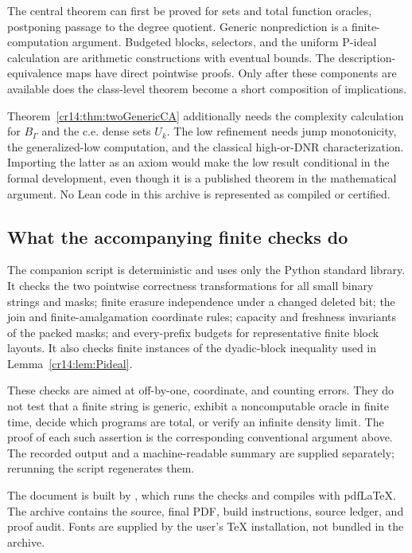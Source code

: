 \documentclass[11pt,a4paper]{article}
\theoremstyle{definition}
\theoremstyle{remark}
\begin{document}
The central theorem can first be proved for sets and total function
oracles, postponing passage to the degree quotient. Generic nonprediction
is a finite-computation argument. Budgeted blocks, selectors, and the
uniform P-ideal calculation are arithmetic constructions with eventual
bounds. The description-equivalence maps have direct pointwise proofs.
Only after these components are available does the class-level theorem
become a short composition of implications.

Theorem~\ref{cr14:thm:twoGenericCA} additionally needs the complexity calculation
for $B_\Gamma$ and the c.e. dense sets $U_k$. The low refinement needs
jump monotonicity, the generalized-low computation, and the classical
high-or-DNR characterization. Importing the latter as an axiom would make
the low result conditional in the formal development, even though it is
a published theorem in the mathematical argument. No Lean code in this
archive is represented as compiled or certified.

\subsection{What the accompanying finite checks do}\label{cr14:sec:checks}
The companion script  is deterministic and
uses only the Python standard library. It checks the two pointwise
correctness transformations for all small binary strings and masks;
finite erasure independence under a changed deleted bit; the join and
finite-amalgamation coordinate rules; capacity and freshness invariants of
the packed masks; and every-prefix budgets for representative finite block
layouts. It also checks finite instances of the dyadic-block inequality
used in Lemma~\ref{cr14:lem:Pideal}.

These checks are aimed at off-by-one, coordinate, and counting errors.
They do not test that a finite string is generic, exhibit a noncomputable
oracle in finite time, decide which programs are total, or verify an
infinite density limit. The proof of each such assertion is the
corresponding conventional argument above. The recorded output and a
machine-readable summary are supplied separately; rerunning the script
regenerates them.

The document is built by , which runs the checks and compiles
 with pdfLaTeX. The archive contains the source, final
PDF, build instructions, source ledger, and proof audit. Fonts are supplied
by the user's TeX installation, not bundled in the archive.
\end{document}
